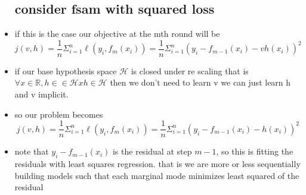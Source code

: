 \documentclass{article}
\begin{document}
\begin{itemize}
\subsection{consider fsam with squared loss}
\item if this is the case our objective at the mth round will be $$j(v,h)=\frac{1}{n}\Sigma_{i=1}^{n}\ell(y_i, f_m(x_i))=\frac{1}{n}\Sigma_{i=1}^{n}(y_i-f_{m-1}(x_i)-vh(x_i))^2$$
\item if our base hypothesis space $\mathcal{H}$ is closed under re scaling that is $\forall x\in \mathbb{R}, h\in \in \mathcal{H} xh\in \mathcal{H}$ then we don't need to learn v we can just learn h and v implicit.
\item so our problem becomes$$j(v,h)=\frac{1}{n}\Sigma_{i=1}^{n}\ell(y_i, f_m(x_i))=\frac{1}{n}\Sigma_{i=1}^{n}(y_i-f_{m-1}(x_i)-h(x_i))^2$$
\item note that $y_i-f_{m-1}(x_i)$ is the residual at step $m-1$, so this is fitting the residuals with least squares regression. that is we are more or less sequentially building models such that each marginal mode minimizes least squared of  the residual  

\end{itemize}
\end{document}

